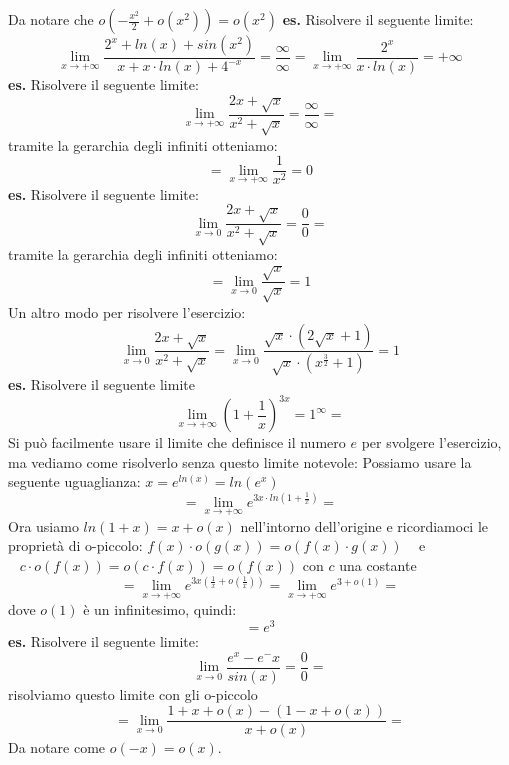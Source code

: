 Da notare che $o(-\frac{x^2}{2}+o(x^2)) = o(x^2)$
\newline
\newline
\newline
\textbf{es.} Risolvere il seguente limite:
\[
    \lim_{x\rightarrow + \infty}\frac{2^x+ln(x)+sin(x^2)}{x+x \cdot ln(x) + 4^{-x} } = \frac{\infty}{\infty} = \lim_{x\rightarrow + \infty}\frac{2^x}{x \cdot ln(x)} = + \infty
\]
\newline
\newline
\textbf{es.} Risolvere il seguente limite:
\[
    \lim_{x\rightarrow +\infty} \frac{2x+\sqrt{x}}{x^2+\sqrt{x}} = \frac{\infty}{\infty} = 
\]
tramite la gerarchia degli infiniti otteniamo:
\[
    = \lim_{x\rightarrow +\infty}\frac{1}{x^2} = 0
\]
\newline
\newline
\textbf{es.}  Risolvere il seguente limite:
\[
    \lim_{x\rightarrow 0} \frac{2x+\sqrt{x}}{x^2+\sqrt{x}} = \frac{0}{0}= 
\]
tramite la gerarchia degli infiniti otteniamo:
\[
    = \lim_{x\rightarrow 0} \frac{\sqrt{x}}{\sqrt{x}} = 1
\]
Un altro modo per risolvere l'esercizio:
\[
    \lim_{x\rightarrow 0} \frac{2x+\sqrt{x}}{x^2 + \sqrt{x}} = \lim_{x\rightarrow 0} \frac{\sqrt{x} \cdot (2 \sqrt{x} +1)}{\sqrt{x} \cdot (x^{\frac{3}{2}}+1)} = 1
\]
\newline
\newline
\textbf{es.} Risolvere il seguente limite
\[
    \lim_{x\rightarrow + \infty} (1+ \frac{1}{x})^{3x} = 1 ^{\infty} = 
\]
Si può facilmente usare il limite che definisce il numero $e$ per svolgere l'esercizio, ma vediamo come risolverlo senza questo limite notevole:
\newline
Possiamo usare la seguente uguaglianza: $x= e^{ln(x)} = ln(e^x)$
\[
    = \lim_{x\rightarrow  + \infty} e^{3x \cdot ln(1+ \frac{1}{x})} =
\]
Ora usiamo $ln(1+x) = x +o(x)$ nell'intorno dell'origine e ricordiamoci le proprietà di o-piccolo: $f(x) \cdot  o(g(x)) = o(f(x) \cdot g(x)) \;\;\;$ e $\;\;\; c \cdot o(f(x)) = o(c \cdot f(x)) = o(f(x))$ con $c$ una costante
\[
    = \lim_{x\rightarrow + \infty} e^{3x(\frac{1}{x}+ o(\frac{1}{x}))} = \lim_{x\rightarrow +\infty} e^{3+o(1)} = 
\]
dove $o(1)$ è un infinitesimo, quindi:
\[
    = e^3
\]
\newline
\newline
\textbf{es.}  Risolvere il seguente limite:
\[
    \lim_{x\rightarrow 0} \frac{e^x - e ^-x}{sin(x)} = \frac{0}{0}=
\]
risolviamo questo limite con gli o-piccolo
\[
    =\lim_{x\rightarrow 0} \frac{1+x+o(x)-(1-x+o(x))}{x + o(x)} =
\]
Da notare come $o(-x) = o(x)$.
